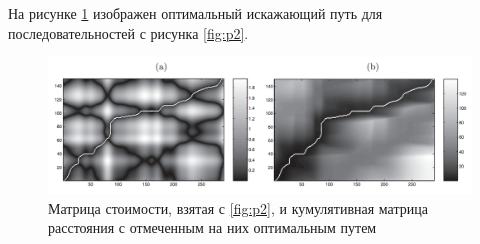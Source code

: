 \documentclass[a4paper, 14pt]{extarticle}
\numberwithin{figure}{subsection}
\let\oldautoref\autoref
\renewcommand{\autoref}[1]{(\oldautoref{#1})}
\numberwithin{equation}{subsection}
\begin{document}
На рисунке \ref{fig:p3} изображен оптимальный искажающий путь для последовательностей с рисунка \ref{fig:p2}.

\begin{figure}[H]
\centering
\includegraphics[width=15cm]{p3.png}
\caption{Матрица стоимости, взятая с \oldautoref{fig:p2}, и кумулятивная матрица расстояния с отмеченным на них оптимальным путем}
\label{fig:p3}
\end{figure}
\end{document}
